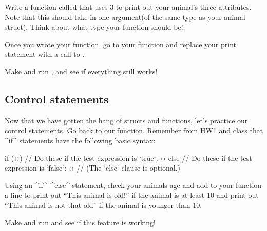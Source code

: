 \documentclass{tufte-handout}
\begin{document}
Write a function called  that uses
3 to print out your animal's three attributes.
Note that this should take in one argument(of the same type as your
animal struct).  Think about what type your function should
be!

Once you wrote your function, go to your  function
and replace your print statement with a call to
.

Make and run , and see if everything still works!  

\subsection{Control statements}

Now that we have gotten the hang of structs and functions, let's
practice our control statements.  Go back to our
 function.  Remember from HW1 and class that
^if^ statements have the following basic syntax:

\begin{Code}
    if (‹›) {
        // Do these if the test expression is `true`:
        ‹›
    } else {
        // Do these if the test expression is `false`:
        ‹›
        // (The `else` clause is optional.)
    }
\end{Code}

Using an ^if^--^else^ statement, check your animals age and add to your
 function a line to print out ``This animal is
old!'' if the animal is at least 10 and print out ``This animal is not
that old'' if the animal is younger than 10.   

Make and run  and see if this feature is working!
\end{document}
